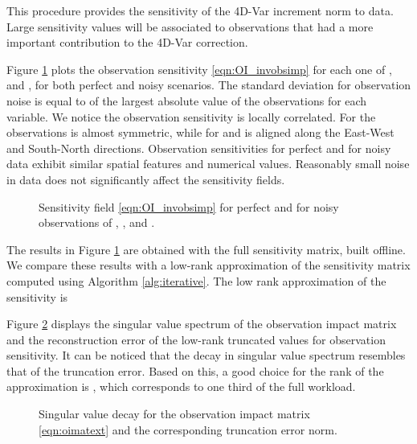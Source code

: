 \documentclass[final,sort&compress]{elsarticle}
\begin{document}
This procedure provides the sensitivity of the 4D-Var increment norm  to data.
Large sensitivity values will be associated to observations that had a more important contribution to the 4D-Var correction.

Figure \ref{fig:OI_perfvspert} plots the observation sensitivity \eqref{eqn:OI_invobsimp} for each one of ,  and , for both perfect and noisy scenarios.
The standard deviation for observation noise is equal to  of the largest absolute value of the observations for each variable. 
We notice the observation sensitivity is locally correlated. 
For the  observations  is almost symmetric, while for  and  is aligned along the East-West and South-North directions. 
Observation sensitivities for perfect and for noisy data exhibit similar spatial features and numerical values.
Reasonably small noise in data does not significantly affect the sensitivity fields.

\begin{figure}
\setcounter{subfigure}{0}
\centering
\caption{Sensitivity field \eqref{eqn:OI_invobsimp} for perfect and for noisy observations of , , and .}
 \label{fig:OI_perfvspert}
\end{figure}

The results in Figure \ref{fig:OI_perfvspert} are obtained with the full sensitivity matrix, built offline.
We compare these results with a low-rank approximation of the sensitivity matrix 
computed using Algorithm \ref{alg:iterative}. The low rank approximation of the sensitivity is

Figure \ref{fig:lowrank} displays the singular value spectrum of the observation impact matrix
and the reconstruction error of the low-rank truncated values for observation sensitivity.
It can be noticed that the decay in singular value spectrum resembles that of the truncation error.
Based on this, a good choice for the rank of the approximation is ,
which corresponds to one third of the full workload.

 \begin{figure}
 \setcounter{subfigure}{0}
  \centering
  \caption{Singular value decay for the observation impact matrix  \eqref{eqn:oimatext} and the corresponding truncation error norm.}
  \label{fig:lowrank}
 \end{figure}
\end{document}
